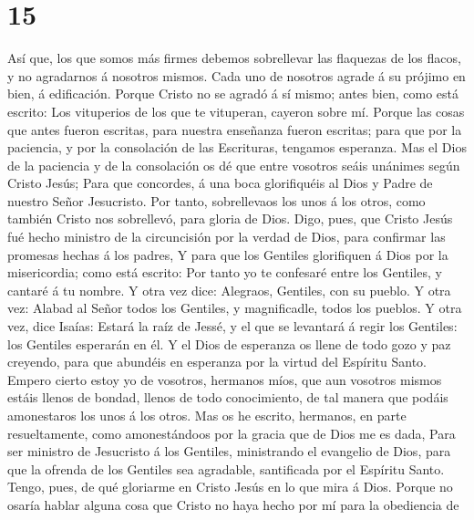 \hypertarget{section-14}{%
\section{15}\label{section-14}}

 Así que, los que somos más firmes debemos sobrellevar las
flaquezas de los flacos, y no agradarnos á nosotros mismos.
 Cada uno de nosotros agrade á su prójimo en bien, á
edificación.  Porque Cristo no se agradó á sí mismo; antes
bien, como está escrito: Los vituperios de los que te vituperan, cayeron
sobre mí.  Porque las cosas que antes fueron escritas,
para nuestra enseñanza fueron escritas; para que por la paciencia, y por
la consolación de las Escrituras, tengamos esperanza.  Mas
el Dios de la paciencia y de la consolación os dé que entre vosotros
seáis unánimes según Cristo Jesús;  Para que concordes, á
una boca glorifiquéis al Dios y Padre de nuestro Señor Jesucristo.
 Por tanto, sobrellevaos los unos á los otros, como
también Cristo nos sobrellevó, para gloria de Dios.  Digo,
pues, que Cristo Jesús fué hecho ministro de la circuncisión por la
verdad de Dios, para confirmar las promesas hechas á los padres,
 Y para que los Gentiles glorifiquen á Dios por la
misericordia; como está escrito: Por tanto yo te confesaré entre los
Gentiles, y cantaré á tu nombre.  Y otra vez dice:
Alegraos, Gentiles, con su pueblo.  Y otra vez: Alabad al
Señor todos los Gentiles, y magnificadle, todos los pueblos.
 Y otra vez, dice Isaías: Estará la raíz de Jessé, y el
que se levantará á regir los Gentiles: los Gentiles esperarán en él.
 Y el Dios de esperanza os llene de todo gozo y paz
creyendo, para que abundéis en esperanza por la virtud del Espíritu
Santo.  Empero cierto estoy yo de vosotros, hermanos
míos, que aun vosotros mismos estáis llenos de bondad, llenos de todo
conocimiento, de tal manera que podáis amonestaros los unos á los otros.
 Mas os he escrito, hermanos, en parte resueltamente,
como amonestándoos por la gracia que de Dios me es dada, 
Para ser ministro de Jesucristo á los Gentiles, ministrando el evangelio
de Dios, para que la ofrenda de los Gentiles sea agradable, santificada
por el Espíritu Santo.  Tengo, pues, de qué gloriarme en
Cristo Jesús en lo que mira á Dios.  Porque no osaría
hablar alguna cosa que Cristo no haya hecho por mí para la obediencia de
